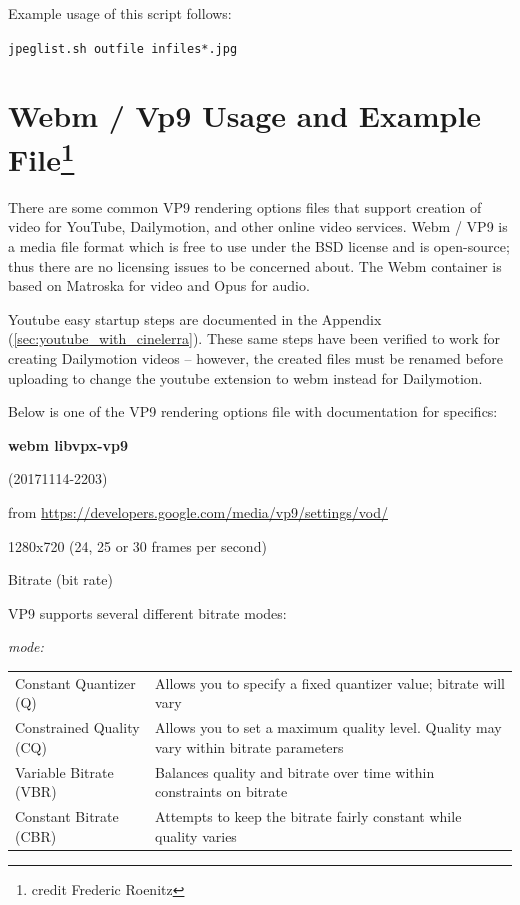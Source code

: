 Example usage of this script follows:

\qquad \texttt{jpeglist.sh outfile infiles*.jpg}

\section{Webm / Vp9 Usage and Example File\protect\footnote{credit Frederic Roenitz}}
\label{sec:webm/vp9_usage_example}

There are some common VP9 rendering options files that support creation of video for YouTube, Dailymotion, and other online video services. Webm / VP9 is a media file format which is free to use under the BSD license and is open-source; thus there are no licensing issues to be concerned about. The Webm container is based on Matroska for video and Opus for audio.

Youtube easy startup steps are documented in the Appendix (\ref{sec:youtube_with_cinelerra}). These same steps have been verified to work for creating Dailymotion videos -- however, the created files must be renamed before uploading to change the youtube extension to webm instead for Dailymotion.

Below is one of the VP9 rendering options file with documentation for specifics:

\textbf{webm libvpx-vp9}

(20171114-2203)

from {\small \url{https://developers.google.com/media/vp9/settings/vod/}}

1280x720 (24, 25 or 30 frames per second)

Bitrate (bit rate)

VP9 supports several different bitrate modes:

\textit{mode:}

\begin{tabular}{p{6cm} p{10cm}}
	Constant Quantizer (Q) & Allows you to specify a fixed quantizer value; bitrate will vary \\
	Constrained Quality (CQ) & Allows you to set a maximum quality level. Quality may vary within bitrate parameters\\
	Variable Bitrate (VBR) & Balances quality and bitrate over time within constraints on bitrate\\
	Constant Bitrate (CBR) & Attempts to keep the bitrate fairly constant while quality varies\\
\end{tabular}

